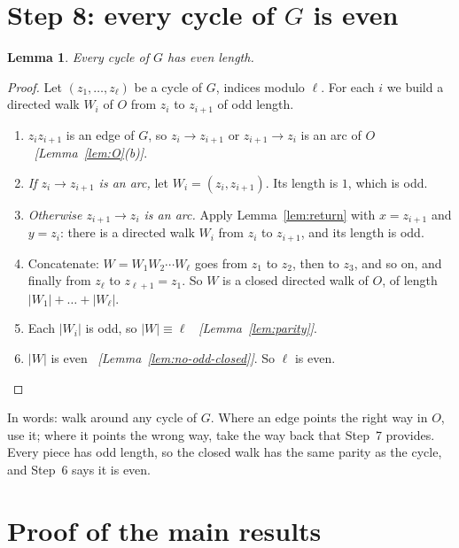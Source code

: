 \documentclass[11pt]{article}
\theoremstyle{plain}
\newtheorem{lemma}[theorem]{Lemma}
\theoremstyle{definition}
\theoremstyle{remark}
\newcommand{\why}[1]{\unskip\ \textit{[#1]}}
\newenvironment{steps}{\begin{enumerate}[label=(\arabic*),leftmargin=2.2em,itemsep=0.35em]}{\end{enumerate}}
\begin{document}
\section{Step 8: every cycle of \texorpdfstring{$G$}{G} is even}\label{sec:step8}

\begin{lemma}\label{lem:even-cycles}
Every cycle of $G$ has even length.
\end{lemma}

\begin{proof}
Let $(z_1,\dots,z_\ell)$ be a cycle of $G$, indices modulo $\ell$. For each $i$ we build a
directed walk $W_i$ of $O$ from $z_i$ to $z_{i+1}$ of odd length.
\begin{steps}
  \item $z_iz_{i+1}$ is an edge of $G$, so $z_i\to z_{i+1}$ or $z_{i+1}\to z_i$ is an arc of $O$
    \why{Lemma~\ref{lem:O}(b)}.
  \item \emph{If $z_i\to z_{i+1}$ is an arc,} let $W_i=(z_i,z_{i+1})$. Its length is $1$, which
    is odd.
  \item \emph{Otherwise $z_{i+1}\to z_i$ is an arc.} Apply Lemma~\ref{lem:return} with
    $x=z_{i+1}$ and $y=z_i$: there is a directed walk $W_i$ from $z_i$ to $z_{i+1}$, and its
    length is odd.
  \item Concatenate: $W=W_1W_2\cdots W_\ell$ goes from $z_1$ to $z_2$, then to $z_3$, and so on,
    and finally from $z_\ell$ to $z_{\ell+1}=z_1$. So $W$ is a closed directed walk of $O$, of
    length $|W_1|+\dots+|W_\ell|$.
  \item Each $|W_i|$ is odd, so $|W|\equiv\ell$ \why{Lemma~\ref{lem:parity}}.
  \item $|W|$ is even \why{Lemma~\ref{lem:no-odd-closed}}. So $\ell$ is even. \qedhere
\end{steps}
\end{proof}

In words: walk around any cycle of $G$. Where an edge points the right way in $O$, use it; where
it points the wrong way, take the way back that Step~7 provides. Every piece has odd length, so
the closed walk has the same parity as the cycle, and Step~6 says it is even.

\section{Proof of the main results}\label{sec:proof-main}
\end{document}
